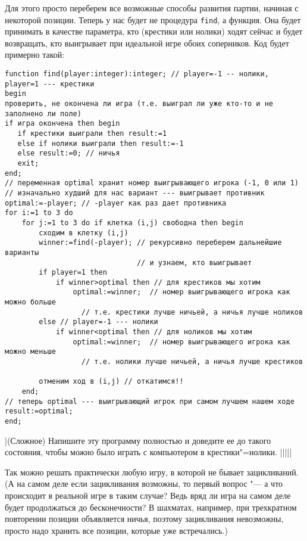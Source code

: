 Для этого просто переберем все возможные способы развития партии, начиная с некоторой позиции. 
Теперь у нас будет не процедура \verb`find`, а функция.
Она будет принимать в качестве параметра, кто (крестики или нолики) ходят сейчас и будет возвращать,
кто выигрывает при идеальной игре обоих соперников. Код будет примерно такой:
\begin{codesampleo}\begin{verbatim}
function find(player:integer):integer; // player=-1 -- нолики, player=1 --- крестики
begin
проверить, не окончена ли игра (т.е. выиграл ли уже кто-то и не заполнено ли поле)
if игра окончена then begin
   if крестики выиграли then result:=1
   else if нолики выиграли then result:=-1
   else result:=0; // ничья
   exit;
end;
// переменная optimal хранит номер выигрывающего игрока (-1, 0 или 1)
// изначально худший для нас вариант --- выигрывает противник
optimal:=-player; // -player как раз дает противника
for i:=1 to 3 do
    for j:=1 to 3 do if клетка (i,j) свободна then begin
        сходим в клетку (i,j)
        winner:=find(-player); // рекурсивно переберем дальнейшие варианты 
                               // и узнаем, кто выигрывает
        if player=1 then
            if winner>optimal then // для крестиков мы хотим 
                optimal:=winner;  // номер выигрывающего игрока как можно больше
                  // т.е. крестики лучше ничьей, а ничья лучше ноликов
        else // player=-1 --- нолики
            if winner<optimal then // для ноликов мы хотим 
                optimal:=winner;  // номер выигрывающего игрока как можно меньше
                  // т.е. нолики лучше ничьей, а ничья лучше крестиков
        
        отменим ход в (i,j) // откатимся!!
    end;
// теперь optimal --- выигрывающий игрок при самом лучшем нашем ходе
result:=optimal; 
end;
\end{verbatim}
\end{codesampleo}

\task|(Сложное) Напишите эту программу полностью и доведите ее до такого состояния, чтобы можно было играть с компьютером
в крестики"=нолики.
|||||

Так можно решать практически любую игру, в которой не бывает зацикливаний. 
(А на самом деле если зацикливания возможны, то первый вопрос "--- а что происходит в реальной игре в таким случае? 
Ведь вряд ли игра на самом деле будет продолжаться до бесконечности?
В шахматах, например, при трехкратном повторении позиции объявляется ничья, поэтому зацикливания невозможны,
просто надо хранить все позиции, которые уже встречались.)

